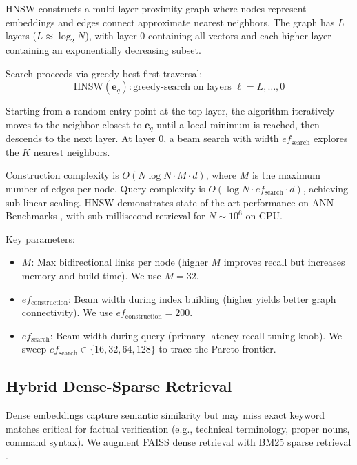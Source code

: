 \documentclass[conference]{IEEEtran}
\begin{document}
HNSW constructs a multi-layer proximity graph where nodes represent embeddings and edges connect approximate nearest neighbors. The graph has $L$ layers ($L \approx \log_2 N$), with layer 0 containing all vectors and each higher layer containing an exponentially decreasing subset.

Search proceeds via greedy best-first traversal:
\begin{equation}
\mathrm{HNSW}(\mathbf{e}_q) : \text{greedy-search on layers } \ell = L, \ldots, 0
\label{eq:hnsw_search}
\end{equation}

Starting from a random entry point at the top layer, the algorithm iteratively moves to the neighbor closest to $\mathbf{e}_q$ until a local minimum is reached, then descends to the next layer. At layer 0, a beam search with width $ef_{\mathrm{search}}$ explores the $K$ nearest neighbors.

Construction complexity is $O(N \log N \cdot M \cdot d)$, where $M$ is the maximum number of edges per node. Query complexity is $O(\log N \cdot ef_{\mathrm{search}} \cdot d)$, achieving sub-linear scaling. HNSW demonstrates state-of-the-art performance on ANN-Benchmarks \cite{aumuller2020annbench}, with sub-millisecond retrieval for $N \sim 10^6$ on CPU.

Key parameters:
\begin{itemize}
    \item $M$: Max bidirectional links per node (higher $M$ improves recall but increases memory and build time). We use $M{=}32$.
    \item $ef_{\mathrm{construction}}$: Beam width during index building (higher yields better graph connectivity). We use $ef_{\mathrm{construction}}{=}200$.
    \item $ef_{\mathrm{search}}$: Beam width during query (primary latency-recall tuning knob). We sweep $ef_{\mathrm{search}} \in \{16, 32, 64, 128\}$ to trace the Pareto frontier.
\end{itemize}

\subsection{Hybrid Dense-Sparse Retrieval}

Dense embeddings capture semantic similarity but may miss exact keyword matches critical for factual verification (e.g., technical terminology, proper nouns, command syntax). We augment FAISS dense retrieval with BM25 sparse retrieval \cite{robertson2009bm25}.
\end{document}
